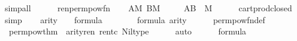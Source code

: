 \begin{isabellebody}
\ simp{\isacharunderscore}{\kern0pt}all\isanewline
\ \ \isamarkupfalse%
\ {\isacharquery}{\kern0pt}{\isasymphi}{\isacharprime}{\kern0pt}\ {\isacharequal}{\kern0pt}\ {\isachardoublequoteopen}ren{\isacharparenleft}{\kern0pt}{\isasymphi}{\isacharparenright}{\kern0pt}{\isacharbackquote}{\kern0pt}{}{\isacharbackquote}{\kern0pt}{}{\isacharbackquote}{\kern0pt}perm{\isacharunderscore}{\kern0pt}pow{\isacharunderscore}{\kern0pt}fn{\isachardoublequoteclose}\isanewline
\ \ \isamarkupfalse%
\ {\isacartoucheopen}A{\isasymin}M{\isacartoucheclose}\ {\isacartoucheopen}B{\isasymin}M{\isacartoucheclose}\ \isamarkupfalse%
\isanewline
\ \ \ \ {\isachardoublequoteopen}A{\isasymtimes}B\ {\isasymin}\ M{\isachardoublequoteclose}\isanewline
\ \ \ \ \isamarkupfalse%
\ cartprod{\isacharunderscore}{\kern0pt}closed\ \isamarkupfalse%
\ simp\isanewline
\ \ \isamarkupfalse%
\ {\isacartoucheopen}arity{\isacharparenleft}{\kern0pt}{\isasymphi}{\isacharparenright}{\kern0pt}\ {\isasymle}\ {}{\isacartoucheclose}\ {\isacartoucheopen}{\isasymphi}{\isasymin}\ formula{\isacartoucheclose}\ {\isacartoucheopen}{}{\isasymin}{\isacharunderscore}{\kern0pt}{\isacartoucheclose}\ {\isacartoucheopen}{}{\isasymin}{\isacharunderscore}{\kern0pt}{\isacartoucheclose}\isanewline
\ \ \isamarkupfalse%
\ {\isachardoublequoteopen}{\isacharquery}{\kern0pt}{\isasymphi}{\isacharprime}{\kern0pt}\ {\isasymin}\ formula{\isachardoublequoteclose}\ {\isachardoublequoteopen}arity{\isacharparenleft}{\kern0pt}{\isacharquery}{\kern0pt}{\isasymphi}{\isacharprime}{\kern0pt}{\isacharparenright}{\kern0pt}{\isasymle}{}{\isachardoublequoteclose}\isanewline
\ \ \ \ \isamarkupfalse%
\ perm{\isacharunderscore}{\kern0pt}pow{\isacharunderscore}{\kern0pt}fn{\isacharunderscore}{\kern0pt}def\isanewline
\ \ \ \ \isamarkupfalse%
\ \ perm{\isacharunderscore}{\kern0pt}pow{\isacharunderscore}{\kern0pt}thm\ \ arity{\isacharunderscore}{\kern0pt}ren\ ren{\isacharunderscore}{\kern0pt}tc\ Nil{\isacharunderscore}{\kern0pt}type\isanewline
\ \ \ \ \isamarkupfalse%
\ auto\isanewline
\ \ \isamarkupfalse%
\ {\isacartoucheopen}{\isacharquery}{\kern0pt}{\isasymphi}{\isacharprime}{\kern0pt}\ {\isasymin}\ formula{\isacartoucheclose}\isanewline
\ \ \isamarkupfalse%

\end{isabellebody}
